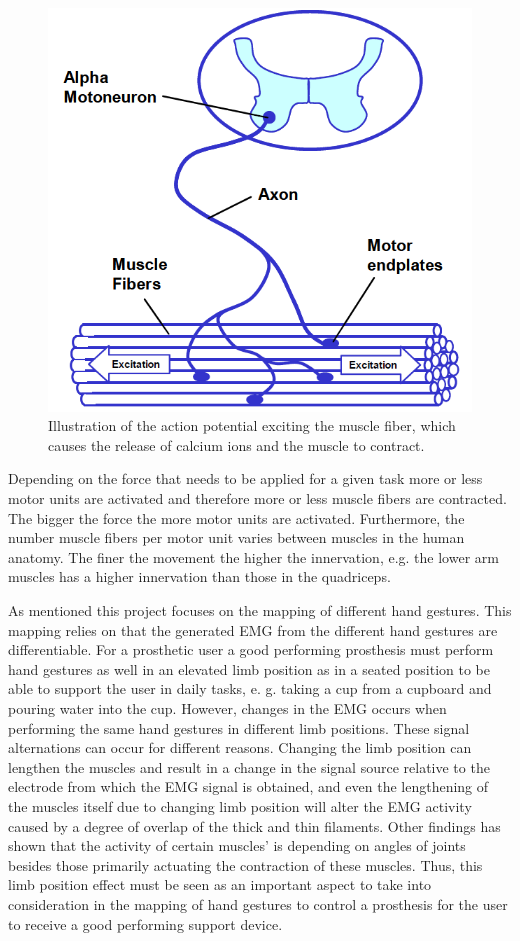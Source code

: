 \begin{figure}[H]
	\includegraphics[width=.4\textwidth]{figures/Anatomy/EMG_generation}  %
	\caption{Illustration of the action potential exciting the muscle fiber, which causes the release of calcium ions and the muscle to contract. \cite{konrad2005}}
	\label{fig:EMG_generation}  %
\end{figure}

Depending on the force that needs to be applied for a given task more or less motor units are activated and therefore more or less muscle fibers are contracted. The bigger the force the more motor units are activated. Furthermore, the number muscle fibers per motor unit varies between muscles in the human anatomy. The finer the movement the higher the innervation, e.g. the lower arm muscles has a higher innervation than those in the quadriceps. \cite{cram2012}



As mentioned this project focuses on the mapping of different hand gestures. This mapping relies on that the generated EMG from the different hand gestures are differentiable. For a prosthetic user a good performing prosthesis must perform hand gestures as well in an elevated limb position as in a seated position to be able to support the user in daily tasks, e. g. taking a cup from a cupboard and pouring water into the cup. However, changes in the EMG occurs when performing the same hand gestures in different limb positions. These signal alternations can occur for different reasons. Changing the limb position can lengthen the muscles and result in a change in the signal source relative to the electrode from which the EMG signal is obtained, and even the lengthening of the muscles itself due to changing limb position will alter the EMG activity caused by a degree of overlap of the thick and thin filaments. Other findings has shown that the activity of certain muscles' is depending on angles of joints besides those primarily actuating the contraction of these muscles. \cite{Fougner2011} Thus, this limb position effect must be seen as an important aspect to take into consideration in the mapping of hand gestures to control a prosthesis for the user to receive a good performing support device. 